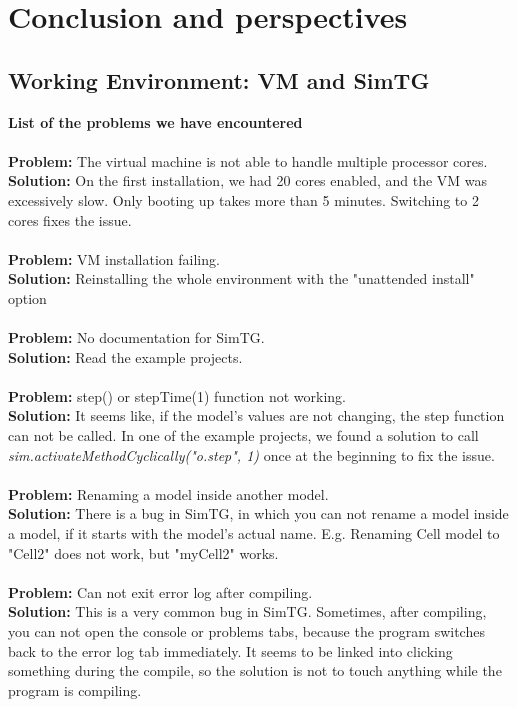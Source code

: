 \section{Conclusion and perspectives}
\label{sec:conclusion}



\subsection{Working Environment: VM and SimTG}
\textbf{List of the problems we have encountered}\\\\
\textbf{Problem:} The virtual machine is not able to handle multiple processor cores.\\
\textbf{Solution:} On the first installation, we had 20 cores enabled, and the VM was excessively slow. Only booting up takes more than 5 minutes. Switching to 2 cores fixes the issue.\\\\
\textbf{Problem:} VM installation failing.\\
\textbf{Solution:} Reinstalling the whole environment with the "unattended install" option\\\\
\textbf{Problem:} No documentation for SimTG.\\
\textbf{Solution:} Read the example projects.\\\\
\textbf{Problem:} step() or stepTime(1) function not working.\\
\textbf{Solution:} It seems like, if the model's values are not changing, the step function can not be called. In one of the example projects, we found a solution to call \\\textit{sim.activateMethodCyclically("o.step", 1)} once at the beginning to fix the issue.\\\\
\textbf{Problem:} Renaming a model inside another model.\\
\textbf{Solution:} There is a bug in SimTG, in which you can not rename a model inside a model, if it starts with the model's actual name. E.g. Renaming Cell model to "Cell2" does not work, but "myCell2" works.\\\\
\textbf{Problem:} Can not exit error log after compiling.\\
\textbf{Solution:} This is a very common bug in SimTG. Sometimes, after compiling, you can not open the console or problems tabs, because the program switches back to the error log tab immediately. It seems to be linked into clicking something during the compile, so the solution is not to touch anything while the program is compiling. \\\\
